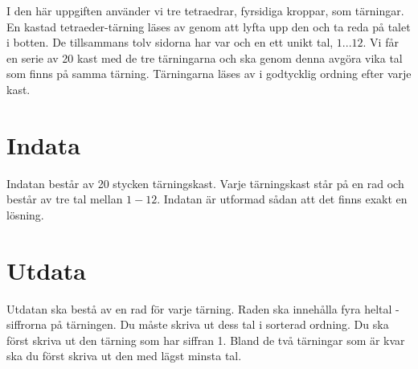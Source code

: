 
I den här uppgiften använder vi tre tetraedrar, fyrsidiga kroppar, som tärningar. En kastad tetraeder-tärning läses av genom att lyfta upp den och ta reda på talet i botten. De tillsammans tolv sidorna har var och en ett unikt tal, $1...12$. Vi får en serie av 20 kast med de tre tärningarna och ska genom denna avgöra vika tal som finns på samma tärning. Tärningarna läses av i godtycklig ordning efter varje kast.

\section*{Indata}
Indatan består av 20 stycken tärningskast. Varje tärningskast står på en rad och består av tre tal mellan $1-12$. Indatan är utformad
sådan att det finns exakt en lösning.

\section*{Utdata}
Utdatan ska bestå av en rad för varje tärning. Raden ska innehålla fyra heltal - siffrorna på tärningen. Du måste skriva ut dess tal i sorterad ordning. Du ska först skriva ut den tärning som har siffran 1. Bland de två tärningar som är kvar ska du först skriva ut den med lägst minsta tal.
